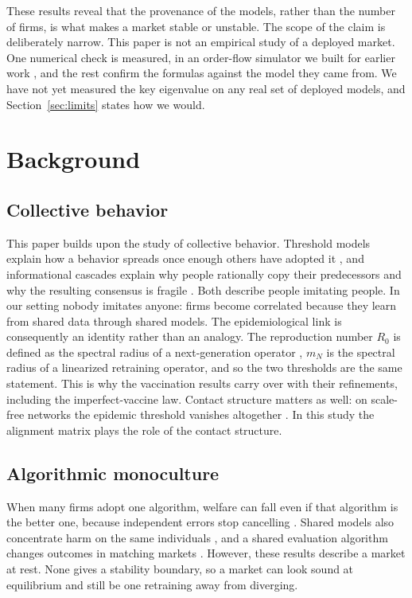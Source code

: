 \documentclass[conference]{IEEEtran}
\theoremstyle{plain}
\newcommand{\mN}{m_N}
\begin{document}
These results reveal that the provenance of the models, rather than the number of firms, is what makes a market stable or unstable. The scope of the claim is deliberately narrow. This paper is not an empirical study of a deployed market. One numerical check is measured, in an order-flow simulator we built for earlier work \cite{reflex2026}, and the rest confirm the formulas against the model they came from. We have not yet measured the key eigenvalue on any real set of deployed models, and Section~\ref{sec:limits} states how we would.

\section{Background}
\label{sec:related}

\subsection{Collective behavior}
This paper builds upon the study of collective behavior. Threshold models explain how a behavior spreads once enough others have adopted it \cite{granovetter1978}, and informational cascades explain why people rationally copy their predecessors and why the resulting consensus is fragile \cite{bikhchandani1992}. Both describe people imitating people. In our setting nobody imitates anyone: firms become correlated because they learn from shared data through shared models. The epidemiological link is consequently an identity rather than an analogy. The reproduction number $R_0$ is defined as the spectral radius of a next-generation operator \cite{diekmann1990}, $\mN$ is the spectral radius of a linearized retraining operator, and so the two thresholds are the same statement. This is why the vaccination results carry over with their refinements, including the imperfect-vaccine law. Contact structure matters as well: on scale-free networks the epidemic threshold vanishes altogether \cite{pastorsatorras2001}. In this study the alignment matrix plays the role of the contact structure.

\subsection{Algorithmic monoculture}
When many firms adopt one algorithm, welfare can fall even if that algorithm is the better one, because independent errors stop cancelling \cite{kleinberg2021}. Shared models also concentrate harm on the same individuals \cite{bommasani2022}, and a shared evaluation algorithm changes outcomes in matching markets \cite{peng2024}. However, these results describe a market at rest. None gives a stability boundary, so a market can look sound at equilibrium and still be one retraining away from diverging.
\end{document}
